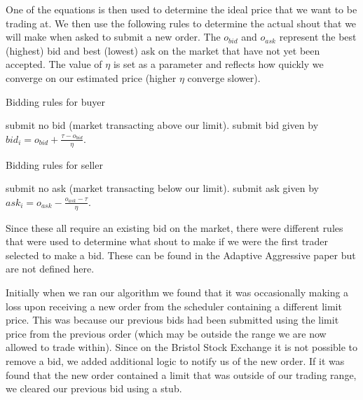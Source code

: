 \documentclass[preprint]{acm_proc_article-sp} %
\begin{document}
One of the equations is then used to determine the ideal price that we want to
be trading at. We then use the following rules to determine the actual shout
that we will make when asked to submit a new order. The $o_{bid}$ and $o_{ask}$
represent the best (highest) bid and best (lowest) ask on the market that have
not yet been accepted. The value of $\eta$ is set as a parameter and reflects
how quickly we converge on our estimated price (higher $\eta$ converge slower).

\begin{algorithm}[H]
    \caption{Bidding rules for buyer}
    \begin{algorithmic}
            \STATE submit no bid (market transacting above our limit).
        \ELSE
            \STATE submit bid given by $bid_i = \textstyle o_{bid} + \frac{\textstyle \tau - o_{bid}}{\textstyle \eta}$.
        \ENDIF
    \end{algorithmic}
    \label{alg:bidding_rules_buyer}
\end{algorithm}

\begin{algorithm}[H]
    \caption{Bidding rules for seller}
    \begin{algorithmic}
            \STATE submit no ask (market transacting below our limit).
        \ELSE
            \STATE submit ask given by $ask_i = \textstyle o_{ask} - \frac{\textstyle o_{ask}-\tau}{\textstyle \eta}$.
        \ENDIF
    \end{algorithmic}
    \label{alg:bidding_rules_seller}
\end{algorithm}

Since these all require an existing bid on the market, there were different
rules that were used to determine what shout to make if we were the first
trader selected to make a bid. These can be found in the Adaptive Aggressive
paper \cite[p.~32]{AA_paper} but are not defined here.

Initially when we ran our algorithm we found that it was occasionally making a
loss upon receiving a new order from the scheduler containing a different limit
price. This was because our previous bids had been submitted using
the limit price from the previous order (which may be outside the range
we are now allowed to trade within). Since on the Bristol Stock Exchange it
is not possible to remove a bid, we added additional logic to notify us of the
new order. If it was found that the new order contained a limit that was
outside of our trading range, we cleared our previous bid using a stub.
\end{document}
